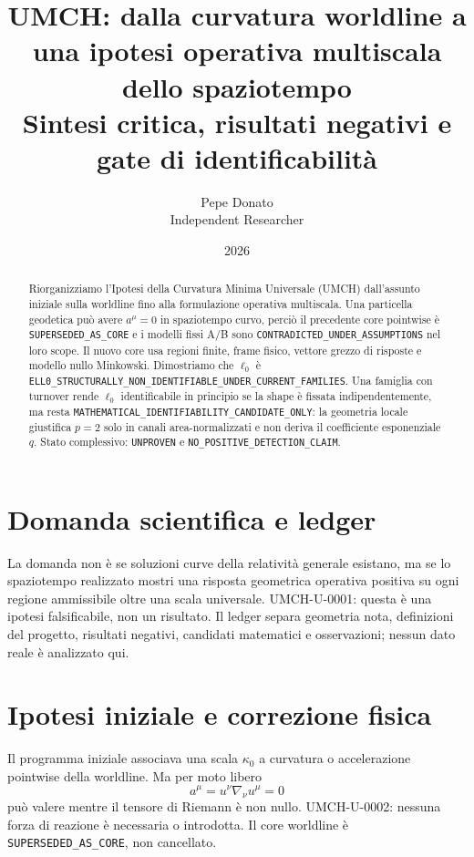 \documentclass[11pt,a4paper]{article}
\title{UMCH: dalla curvatura worldline a una ipotesi operativa multiscala dello spaziotempo\\Sintesi critica, risultati negativi e gate di identificabilità}
\author{Pepe Donato\\Independent Researcher}\date{2026}
\begin{document}
\maketitle
\begin{abstract}
Riorganizziamo l'Ipotesi della Curvatura Minima Universale (UMCH) dall'assunto iniziale sulla worldline fino alla formulazione operativa multiscala. Una particella geodetica può avere $a^\mu=0$ in spaziotempo curvo, perciò il precedente core pointwise è \verb|SUPERSEDED_AS_CORE| e i modelli fissi A/B sono \verb|CONTRADICTED_UNDER_ASSUMPTIONS| nel loro scope. Il nuovo core usa regioni finite, frame fisico, vettore grezzo di risposte e modello nullo Minkowski. Dimostriamo che $\ell_0$ è \verb|ELL0_STRUCTURALLY_NON_IDENTIFIABLE_UNDER_CURRENT_FAMILIES|. Una famiglia con turnover rende $\ell_0$ identificabile in principio se la shape è fissata indipendentemente, ma resta \verb|MATHEMATICAL_IDENTIFIABILITY_CANDIDATE_ONLY|: la geometria locale giustifica $p=2$ solo in canali area-normalizzati e non deriva il coefficiente esponenziale $q$. Stato complessivo: \verb|UNPROVEN| e \verb|NO_POSITIVE_DETECTION_CLAIM|.
\end{abstract}

\section{Domanda scientifica e ledger}\label{sec:u-question}
La domanda non è se soluzioni curve della relatività generale esistano, ma se lo spaziotempo realizzato mostri una risposta geometrica operativa positiva su ogni regione ammissibile oltre una scala universale. UMCH-U-0001: questa è una ipotesi falsificabile, non un risultato. Il ledger separa geometria nota, definizioni del progetto, risultati negativi, candidati matematici e osservazioni; nessun dato reale è analizzato qui.

\section{Ipotesi iniziale e correzione fisica}\label{sec:u-history}
Il programma iniziale associava una scala $\kappa_0$ a curvatura o accelerazione pointwise della worldline. Ma per moto libero
\begin{equation}\label{eq:u-geodesic}a^\mu=u^\nu\nabla_\nu u^\mu=0
\end{equation}
può valere mentre il tensore di Riemann è non nullo. UMCH-U-0002: nessuna forza di reazione è necessaria o introdotta. Il core worldline è \verb|SUPERSEDED_AS_CORE|, non cancellato.
\end{document}
